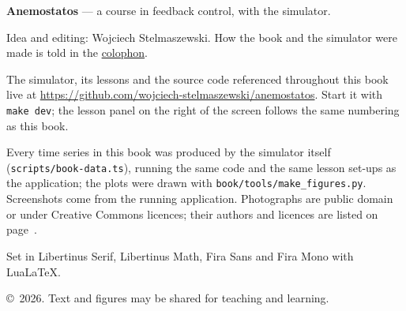 \thispagestyle{empty}
\vspace*{\fill}
\noindent\begin{minipage}{118mm}\sffamily\footnotesize\color{muted}\linespread{1.25}\selectfont
\textbf{\color{ink}Anemostatos} — a course in feedback control, with the simulator.\par\medskip
Idea and editing: Wojciech Stelmaszewski. How the book and the simulator were made is told in the
\hyperref[ch:colophon]{colophon}.\par\medskip
The simulator, its lessons and the source code referenced throughout this book live at
\url{https://github.com/wojciech-stelmaszewski/anemostatos}. Start it with \texttt{make dev}; the lesson panel on the right
of the screen follows the same numbering as this book.\par\medskip
Every time series in this book was produced by the simulator itself (\texttt{scripts/book-data.ts}), running the
same code and the same lesson set-ups as the application; the plots were drawn with \texttt{book/tools/make\_figures.py}. Screenshots
come from the running application. Photographs are public domain or under Creative Commons licences; their
authors and licences are listed on page~\pageref{credits}.\par\medskip
Set in Libertinus Serif, Libertinus Math, Fira Sans and Fira Mono with Lua\LaTeX.\par\medskip
\copyright\ 2026. Text and figures may be shared for teaching and learning.
\end{minipage}
\clearpage
